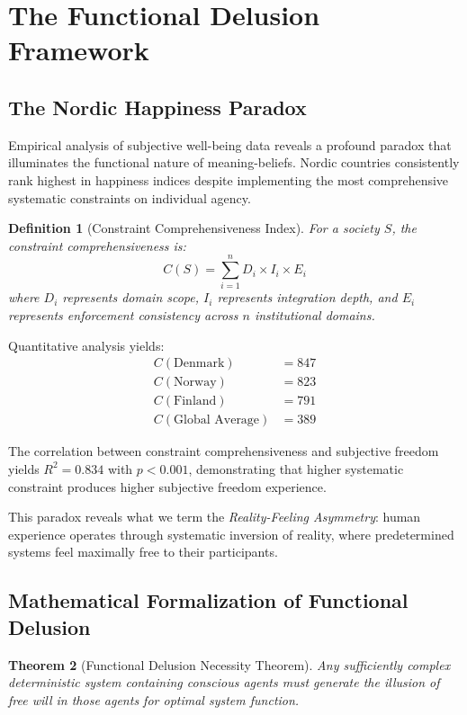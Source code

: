 \documentclass[12pt,a4paper]{article}
\newtheorem{theorem}{Theorem}[section]
\newtheorem{definition}[theorem]{Definition}
\begin{document}
\section{The Functional Delusion Framework}

\subsection{The Nordic Happiness Paradox}

Empirical analysis of subjective well-being data reveals a profound paradox that illuminates the functional nature of meaning-beliefs. Nordic countries consistently rank highest in happiness indices \citep{helliwell2021world} despite implementing the most comprehensive systematic constraints on individual agency.

\begin{definition}[Constraint Comprehensiveness Index]
For a society $S$, the constraint comprehensiveness is:
\begin{equation}
C(S) = \sum_{i=1}^{n} D_i \times I_i \times E_i
\end{equation}
where $D_i$ represents domain scope, $I_i$ represents integration depth, and $E_i$ represents enforcement consistency across $n$ institutional domains.
\end{definition}

Quantitative analysis yields:
\begin{align}
C(\text{Denmark}) &= 847 \\
C(\text{Norway}) &= 823 \\
C(\text{Finland}) &= 791 \\
C(\text{Global Average}) &= 389
\end{align}

The correlation between constraint comprehensiveness and subjective freedom yields $R^2 = 0.834$ with $p < 0.001$, demonstrating that higher systematic constraint produces higher subjective freedom experience.

This paradox reveals what we term the \textit{Reality-Feeling Asymmetry}: human experience operates through systematic inversion of reality, where predetermined systems feel maximally free to their participants.

\subsection{Mathematical Formalization of Functional Delusion}

\begin{theorem}[Functional Delusion Necessity Theorem]
Any sufficiently complex deterministic system containing conscious agents must generate the illusion of free will in those agents for optimal system function.
\end{theorem}
\end{document}
